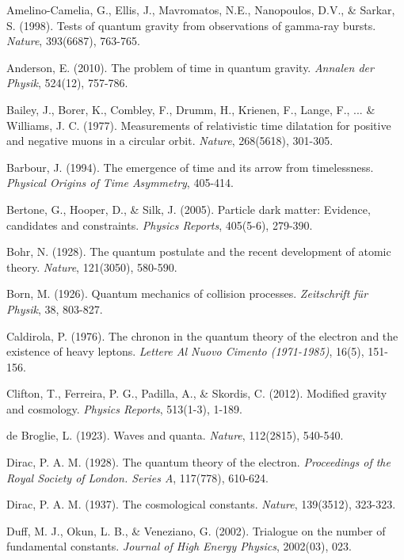 \documentclass[a4paper,12pt]{article}
\begin{document}
	\begin{thebibliography}{99}
		 Amelino-Camelia, G., Ellis, J., Mavromatos, N.E., Nanopoulos, D.V., \& Sarkar, S. (1998). Tests of quantum gravity from observations of gamma-ray bursts. \textit{Nature}, 393(6687), 763-765.
		
		 Anderson, E. (2010). The problem of time in quantum gravity. \textit{Annalen der Physik}, 524(12), 757-786.
		
		 Bailey, J., Borer, K., Combley, F., Drumm, H., Krienen, F., Lange, F., ... \& Williams, J. C. (1977). Measurements of relativistic time dilatation for positive and negative muons in a circular orbit. \textit{Nature}, 268(5618), 301-305.
		
		 Barbour, J. (1994). The emergence of time and its arrow from timelessness. \textit{Physical Origins of Time Asymmetry}, 405-414.
		
		 Bertone, G., Hooper, D., \& Silk, J. (2005). Particle dark matter: Evidence, candidates and constraints. \textit{Physics Reports}, 405(5-6), 279-390.
		
		 Bohr, N. (1928). The quantum postulate and the recent development of atomic theory. \textit{Nature}, 121(3050), 580-590.
		
		 Born, M. (1926). Quantum mechanics of collision processes. \textit{Zeitschrift für Physik}, 38, 803-827.
		
		 Caldirola, P. (1976). The chronon in the quantum theory of the electron and the existence of heavy leptons. \textit{Lettere Al Nuovo Cimento (1971-1985)}, 16(5), 151-156.
		
		 Clifton, T., Ferreira, P. G., Padilla, A., \& Skordis, C. (2012). Modified gravity and cosmology. \textit{Physics Reports}, 513(1-3), 1-189.
		
		 de Broglie, L. (1923). Waves and quanta. \textit{Nature}, 112(2815), 540-540.
		
		 Dirac, P. A. M. (1928). The quantum theory of the electron. \textit{Proceedings of the Royal Society of London. Series A}, 117(778), 610-624.
		
		 Dirac, P. A. M. (1937). The cosmological constants. \textit{Nature}, 139(3512), 323-323.
		
		 Duff, M. J., Okun, L. B., \& Veneziano, G. (2002). Trialogue on the number of fundamental constants. \textit{Journal of High Energy Physics}, 2002(03), 023.
		

\end{thebibliography}
\end{document}
